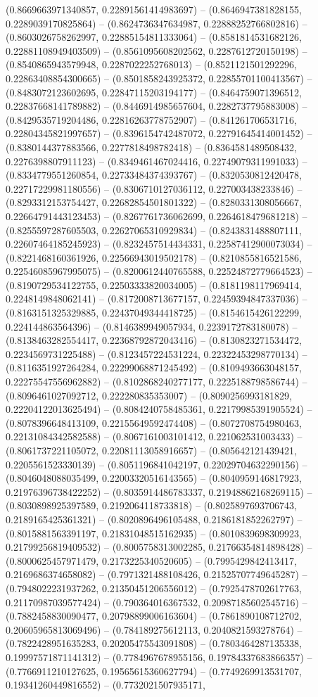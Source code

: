 (0.8669663971340857, 0.22891561414983697) -- (0.8646947381828155, 0.2289039170825864) -- (0.8624736347634987, 0.22888252766802816) -- (0.8603026758262997, 0.22885154811333064) -- (0.8581814531682126, 0.22881108949403509) -- (0.8561095608202562, 0.2287612720150198) -- (0.8540865943579948, 0.2287022252768013) -- (0.8521121501292296, 0.22863408854300665) -- (0.8501858243925372, 0.22855701100413567) -- (0.8483072123602695, 0.22847115203194177) -- (0.8464759071396512, 0.22837668141789882) -- (0.8446914985657604, 0.2282737795883008) -- (0.8429535719204486, 0.22816263778752907) -- (0.841261706531716, 0.22804345821997657) -- (0.8396154742487072, 0.22791645414001452) -- (0.8380144377883566, 0.2277818498782418) -- (0.8364581489508432, 0.2276398807911123) -- (0.8349461467024416, 0.22749079311991033) -- (0.8334779551260854, 0.22733484374393767) -- (0.8320530812420478, 0.22717229981180556) -- (0.8306710127036112, 0.227003438233846) -- (0.8293312153754427, 0.22682854501801322) -- (0.8280331308056667, 0.22664791443123453) -- (0.8267761736062699, 0.2264618479681218) -- (0.8255597287605503, 0.22627065310929834) -- (0.8243831488807111, 0.22607464185245923) -- (0.8232457514434331, 0.22587412900073034) -- (0.8221468160361926, 0.22566943019502178) -- (0.8210855816521586, 0.22546085967995075) -- (0.8200612440765588, 0.22524872779664523) -- (0.8190729534122755, 0.22503333820034005) -- (0.8181198117969414, 0.2248149848062141) -- (0.8172008713677157, 0.22459394847337036) -- (0.8163151325329885, 0.22437049344418725) -- (0.8154615426122299, 0.224144863564396) -- (0.8146389949057934, 0.2239172783180078) -- (0.8138463282554417, 0.22368792872043416) -- (0.8130823271534472, 0.2234569731225488) -- (0.8123457224531224, 0.22322453298770134) -- (0.8116351927264284, 0.22299068871245492) -- (0.8109493663048157, 0.22275547556962882) -- (0.8102868240277177, 0.2225188798586744) -- (0.8096461027092712, 0.222280835353007) -- (0.8090256993181829, 0.22204122013625494) -- (0.8084240758485361, 0.22179985391905524) -- (0.8078396648413109, 0.22155649592474408) -- (0.8072708754980463, 0.22131084342582588) -- (0.8067161003101412, 0.221062531003433) -- (0.8061737221105072, 0.22081113058916657) -- (0.805642121439421, 0.2205561523330139) -- (0.8051196841042197, 0.22029704632290156) -- (0.8046048088035499, 0.22003320516143565) -- (0.8040959146817923, 0.21976396738422252) -- (0.8035914486783337, 0.21948862168269115) -- (0.8030898925397589, 0.2192064118733818) -- (0.8025897693706743, 0.2189165425361321) -- (0.8020896496105488, 0.2186181852262797) -- (0.8015881563391197, 0.21831048515162935) -- (0.8010839698309923, 0.21799256819409532) -- (0.8005758313002285, 0.21766354814898428) -- (0.8000625457971479, 0.2173225340520605) -- (0.7995429842413417, 0.2169686374658082) -- (0.7971321488108426, 0.21525707749645287) -- (0.7948022231937262, 0.21350451206556012) -- (0.7925478702617763, 0.21170987039577424) -- (0.790364016367532, 0.20987185602545716) -- (0.7882458830090477, 0.20798899006163604) -- (0.7861890108712702, 0.20605965813069496) -- (0.784189275612113, 0.2040821593278764) -- (0.7822428951635283, 0.20205475543091808) -- (0.7803464287135338, 0.19997571871141312) -- (0.7784967678955156, 0.19784337683866357) -- (0.7766911210127625, 0.19565615360627794) -- (0.7749269913531707, 0.19341260449816552) -- (0.7732021507935171, 